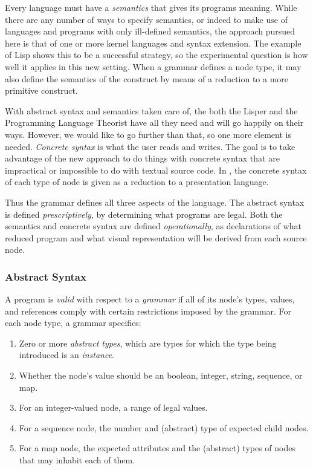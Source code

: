 Every language must have a \emph{semantics} that gives its programs meaning. While there are any number of ways to specify semantics, or indeed to make use of languages and programs with only ill-defined semantics, the approach pursued here is that of one or more kernel languages and syntax extension. The example of Lisp shows this to be a successful strategy, so the experimental question is how well it applies in this new setting. When a grammar defines a node type, it may also define the semantics of the construct by means of a reduction to a more primitive construct.

With abstract syntax and semantics taken care of, the both the Lisper and the Programming Language Theorist have all they need and will go happily on their ways. However, we would like to go further than that, so one more element is needed. \emph{Concrete syntax} is what the user reads and writes. The goal is to take advantage of the new approach to do things with concrete syntax that are impractical or impossible to do with textual source code. In \Meta, the concrete syntax of each type of node is given as a reduction to a presentation language.

Thus the grammar defines all three aspects of the language. The abstract syntax is defined \emph{prescriptively}, by determining what programs are legal. Both the semantics and concrete syntax are defined \emph{operationally}, as declarations of what reduced program and what visual representation will be derived from each source node.


\subsubsection{Abstract Syntax}
A program is \emph{valid} with respect to a \emph{grammar} if all of its node's types, values, and references comply with certain restrictions imposed by the grammar. For each node type, a grammar specifies:
\begin{enumerate}
\item Zero or more \emph{abstract types}, which are types for which the type being introduced is an \emph{instance}.
\item Whether the node's value should be an boolean, integer, string, sequence, or map.
\item For an integer-valued node, a range of legal values.
\item For a sequence node, the number and (abstract) type of expected child nodes.
\item For a map node, the expected attributes and the (abstract) types of nodes that may inhabit each of them.
\end{enumerate}

